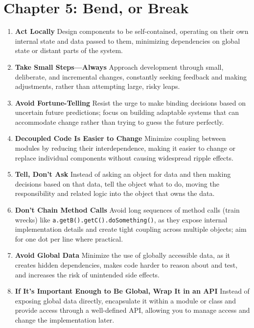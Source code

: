 \documentclass[11pt]{article}
\begin{document}
\section*{Chapter 5: Bend, or Break}
\begin{enumerate}[label=\arabic*., start=41, itemsep=1ex]
    \item \textbf{Act Locally}
    Design components to be self-contained, operating on their own internal state and data passed to them, minimizing dependencies on global state or distant parts of the system.

    \item \textbf{Take Small Steps—Always}
    Approach development through small, deliberate, and incremental changes, constantly seeking feedback and making adjustments, rather than attempting large, risky leaps.

    \item \textbf{Avoid Fortune-Telling}
    Resist the urge to make binding decisions based on uncertain future predictions; focus on building adaptable systems that can accommodate change rather than trying to guess the future perfectly.

    \item \textbf{Decoupled Code Is Easier to Change}
    Minimize coupling between modules by reducing their interdependence, making it easier to change or replace individual components without causing widespread ripple effects.

    \item \textbf{Tell, Don’t Ask}
    Instead of asking an object for data and then making decisions based on that data, tell the object what to do, moving the responsibility and related logic into the object that owns the data.

    \item \textbf{Don’t Chain Method Calls}
    Avoid long sequences of method calls (train wrecks) like \texttt{a.getB().getC().doSomething()}, as they expose internal implementation details and create tight coupling across multiple objects; aim for one dot per line where practical.

    \item \textbf{Avoid Global Data}
    Minimize the use of globally accessible data, as it creates hidden dependencies, makes code harder to reason about and test, and increases the risk of unintended side effects.

    \item \textbf{If It’s Important Enough to Be Global, Wrap It in an API}
    Instead of exposing global data directly, encapsulate it within a module or class and provide access through a well-defined API, allowing you to manage access and change the implementation later.


\end{enumerate}
\end{document}
